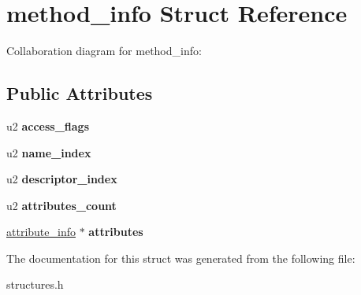 \hypertarget{structmethod__info}{}\section{method\+\_\+info Struct Reference}
\label{structmethod__info}


Collaboration diagram for method\+\_\+info\+:
\subsection*{Public Attributes}
\begin{DoxyCompactItemize}
\item 
u2 {\bfseries access\+\_\+flags}\hypertarget{structmethod__info_a3b657027a141cdbc94ded28607c98be5}{}\label{structmethod__info_a3b657027a141cdbc94ded28607c98be5}

\item 
u2 {\bfseries name\+\_\+index}\hypertarget{structmethod__info_ab91d62d0658b77bba83f6bb685e3bbb9}{}\label{structmethod__info_ab91d62d0658b77bba83f6bb685e3bbb9}

\item 
u2 {\bfseries descriptor\+\_\+index}\hypertarget{structmethod__info_a7713103e0c8d060630ad62774fb9be37}{}\label{structmethod__info_a7713103e0c8d060630ad62774fb9be37}

\item 
u2 {\bfseries attributes\+\_\+count}\hypertarget{structmethod__info_ad9e5e1e2fc850806addadd6deab8565d}{}\label{structmethod__info_ad9e5e1e2fc850806addadd6deab8565d}

\item 
\hyperlink{structattribute__info}{attribute\+\_\+info} $\ast$ {\bfseries attributes}\hypertarget{structmethod__info_a8ce4caaa03680c91f548558a38647ad8}{}\label{structmethod__info_a8ce4caaa03680c91f548558a38647ad8}

\end{DoxyCompactItemize}


The documentation for this struct was generated from the following file\+:\begin{DoxyCompactItemize}
\item 
structures.\+h\end{DoxyCompactItemize}
